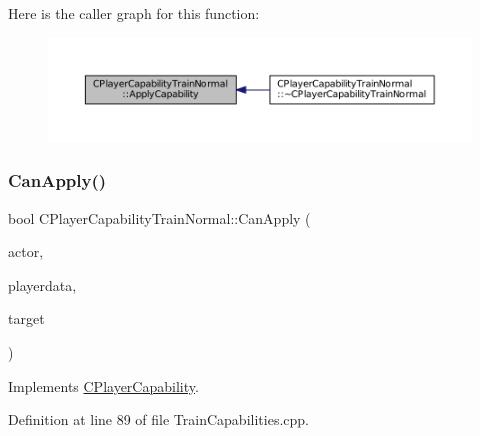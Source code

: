 Here is the caller graph for this function\+:
\nopagebreak
\begin{figure}[H]
\begin{center}
\leavevmode
\includegraphics[width=350pt]{classCPlayerCapabilityTrainNormal_a04ed166d2072d44ddc96735ac1beb9bc_icgraph}
\end{center}
\end{figure}
\hypertarget{classCPlayerCapabilityTrainNormal_a625d2154bed47357f45662fe5dee7c1b}{}\label{classCPlayerCapabilityTrainNormal_a625d2154bed47357f45662fe5dee7c1b} 
\subsubsection{\texorpdfstring{Can\+Apply()}{CanApply()}}
{\footnotesize\ttfamily bool C\+Player\+Capability\+Train\+Normal\+::\+Can\+Apply (\begin{DoxyParamCaption}\item[{std\+::shared\+\_\+ptr$<$ \hyperlink{classCPlayerAsset}{C\+Player\+Asset} $>$}]{actor,  }\item[{std\+::shared\+\_\+ptr$<$ \hyperlink{classCPlayerData}{C\+Player\+Data} $>$}]{playerdata,  }\item[{std\+::shared\+\_\+ptr$<$ \hyperlink{classCPlayerAsset}{C\+Player\+Asset} $>$}]{target }\end{DoxyParamCaption})\hspace{0.3cm}{\ttfamily [virtual]}}



Implements \hyperlink{classCPlayerCapability_ae96263e0950f496492f8baeb877b9554}{C\+Player\+Capability}.



Definition at line 89 of file Train\+Capabilities.\+cpp.


